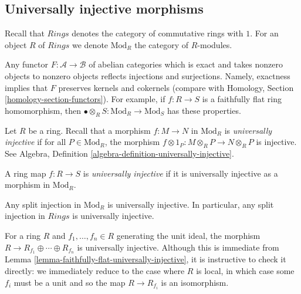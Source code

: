 \subsection{Universally injective morphisms}
\label{subsection-universally-injective}

\noindent
Recall that $\textit{Rings}$ denotes the category of commutative rings
with $1$. For an object $R$ of $\textit{Rings}$ we denote $\text{Mod}_R$
the category of $R$-modules.

\begin{remark}
\label{remark-reflects}
Any functor $F : \mathcal{A} \to \mathcal{B}$ of abelian categories
which is exact and takes nonzero objects to nonzero objects reflects
injections and surjections. Namely, exactness implies that
$F$ preserves kernels and cokernels (compare with
Homology, Section \ref{homology-section-functors}).
For example, if $f : R \to S$ is a 
faithfully flat ring homomorphism, then
$\bullet \otimes_R S: \text{Mod}_R \to \text{Mod}_S$ has these properties.
\end{remark}

\noindent
Let $R$ be a ring. Recall that a morphism $f : M \to N$ in $\text{Mod}_R$
is {\it universally injective} if for all $P \in \text{Mod}_R$,
the morphism $f \otimes 1_P: M \otimes_R P \to N \otimes_R P$ is injective.
See Algebra, Definition \ref{algebra-definition-universally-injective}.

\begin{definition}
\label{definition-universally-injective}
A ring map $f: R \to S$ is {\it universally injective}
if it is universally injective as a morphism in $\text{Mod}_R$.
\end{definition}

\begin{example}
\label{example-split-injection-universally-injective}
Any split injection in $\text{Mod}_R$ is universally injective. In particular,
any split injection in $\textit{Rings}$ is universally injective.
\end{example}

\begin{example}
\label{example-cover-universally-injective}
For a ring $R$ and $f_1,\dots,f_n \in R$ generating the unit
ideal, the morphism $R \to R_{f_1} \oplus \cdots \oplus R_{f_n}$ is
universally injective. Although this is immediate from
Lemma \ref{lemma-faithfully-flat-universally-injective},
it is instructive to check it directly: we immediately reduce to the case
where $R$ is local, in which case some $f_i$ must be a unit and so the map
$R \to R_{f_i}$ is an isomorphism.
\end{example}

